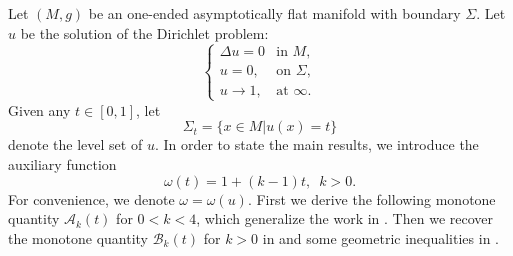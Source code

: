 \documentclass[12pt]{article}
\theoremstyle{definition}
\theoremstyle{plain}
\numberwithin{equation}{section}
\begin{document}
Let $ (M,g) $ be an one-ended asymptotically flat manifold with boundary $ \Sigma $. Let $ u $ be the solution of the Dirichlet problem:
\begin{equation}\label{u}
\begin{cases}
\Delta u=0 &\text{in } M,\\
u=0, &\text{on } \Sigma,\\
u\to 1, &\text{at } \infty.
\end{cases}
\end{equation}
Given any $ t\in [0,1] $, let 
$$ 
\Sigma_{t}=\{x\in M| u(x)=t\} 
$$ 
denote the level set of $ u $.
In order to state the main results, we introduce the auxiliary function
$$
\omega(t)=1+(k-1)t,\,\,\, k>0.
$$
For convenience, we denote $ \omega=\omega(u) $. First we derive the following monotone quantity $ \mathcal{A}_{k}(t) $ for $ 0<k<4 $, which generalize the work in \cite{Miao}. Then we recover the monotone quantity $ \mathcal{B}_{k}(t) $ for $ k>0 $ in \cite{Miao 0} and some geometric inequalities in \cite{Miao}.
\end{document}
